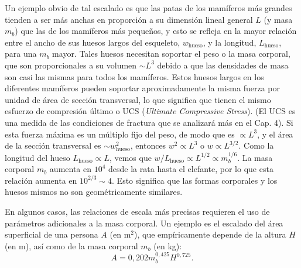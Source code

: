 \documentclass[12pt]{book}
\begin{document}
Un ejemplo obvio de tal escalado es que las patas de los mamíferos más grandes tienden a ser más anchas en proporción a su dimensión lineal general $L$ (y masa $m_b$) que las de los mamíferos más pequeños, y esto se refleja en la mayor relación entre el ancho de sus huesos largos del esqueleto, $w_{\text{hueso}}$, y la longitud, $L_{\text{hueso}}$, para una $m_b$ mayor. Tales huesos necesitan soportar el peso o la masa corporal, que son proporcionales a su volumen $\sim L^3$ debido a que las densidades de masa son casi las mismas para todos los mamíferos. Estos huesos largos en los diferentes mamíferos pueden soportar aproximadamente la misma fuerza por unidad de área de sección transversal, lo que significa que tienen el mismo esfuerzo de compresión último o UCS (\textit{Ultimate Compressive Stress}). (El UCS es una medida de las condiciones de fractura que se analizará más en el Cap. 4). Si esta fuerza máxima es un múltiplo fijo del peso, de modo que es $\propto L^3$, y el área de la sección transversal es $\sim w_{\text{hueso}}^2$, entonces $w^2 \propto L^3$ o $w \propto L^{3/2}$. Como la longitud del hueso $L_{\text{hueso}} \propto L$, vemos que $w/L_{\text{hueso}} \propto L^{1/2} \propto m_b^{1/6}$. La masa corporal $m_b$ aumenta en $10^4$ desde la rata hasta el elefante, por lo que esta relación aumenta en $10^{2/3} \sim 4$. Esto significa que las formas corporales y los huesos mismos no son geométricamente similares.

En algunos casos, las relaciones de escala más precisas requieren el uso de parámetros adicionales a la masa corporal. Un ejemplo es el escalado del área superficial de una persona $A$ (en $\text{m}^2$), que empíricamente depende de la altura $H$ (en m), así como de la masa corporal $m_b$ (en kg):
\begin{equation}
A = 0,202 m_b^{0,425} H^{0,725}.
\label{eq:1.2}
\end{equation}
\end{document}
